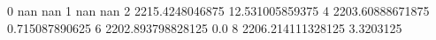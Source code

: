 0 nan nan
1 nan nan
2 2215.4248046875 12.531005859375
4 2203.60888671875 0.715087890625
6 2202.893798828125 0.0
8 2206.214111328125 3.3203125
